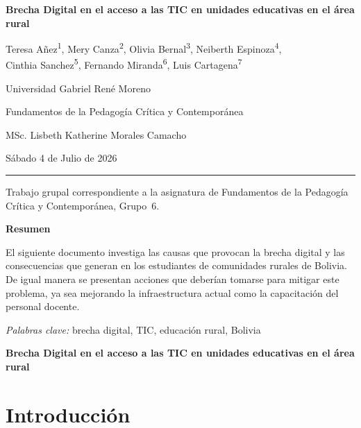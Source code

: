 \documentclass[12pt]{article}
\newcommand{\docTitulo}{Brecha Digital en el acceso a las TIC en unidades
  educativas en el área rural}
\newcommand{\docAutores}{%
  Teresa Añez\textsuperscript{1}, 
  Mery Canza\textsuperscript{2}, 
  Olivia Bernal\textsuperscript{3}, 
  Neiberth Espinoza\textsuperscript{4},\\
  Cinthia Sanchez\textsuperscript{5}, 
  Fernando Miranda\textsuperscript{6}, 
  Luis Cartagena\textsuperscript{7}}
\newcommand{\docInstitucion}{Universidad Gabriel René Moreno}
\newcommand{\docAsignatura}{Fundamentos de la Pedagogía Crítica y Contemporánea}
\newcommand{\docDocente}{MSc. Lisbeth Katherine Morales Camacho}
\newcommand{\docFecha}{Sábado 4 de Julio de 2026}
\newcommand{\docResumen}{%
  El siguiente documento investiga las causas que provocan la brecha digital
  y las consecuencias que generan en los estudiantes de comunidades rurales de
  Bolivia. De igual manera se presentan acciones que deberían tomarse para
  mitigar este problema, ya sea mejorando la infraestructura actual como la
  capacitación del personal docente.}
\newcommand{\docPalabrasClave}{brecha digital, TIC, educación rural, Bolivia}
\newcommand{\docNotaAutor}{%
  Trabajo grupal correspondiente a la asignatura de \docAsignatura, Grupo~6.}
\begin{document}
\thispagestyle{portada}
\begin{center}
  \vspace*{2in}
  {\bfseries\docTitulo}\par
  \vspace{24pt}
  \docAutores\par
  \vspace{6pt}
  \docInstitucion\par
  \vspace{6pt}
  \docAsignatura\par
  \docDocente\par
  \docFecha\par
\end{center}

\vfill
\noindent\rule{\linewidth}{0.4pt}\par
\vspace{4pt}
\par
\vspace{4pt}
\noindent\docNotaAutor\par

\newpage

\begin{center}
  {\bfseries Resumen}
\end{center}
\noindent\docResumen\par
\vspace{12pt}
\noindent\textit{Palabras clave:} \docPalabrasClave

\newpage

\begin{center}
  {\bfseries\docTitulo}
\end{center}

\justifying
\setlength{\parindent}{0.5in}

\section{Introducción}
\end{document}
